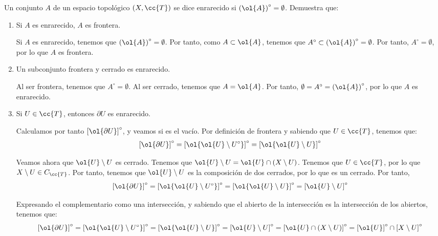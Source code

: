 \begin{ejercicio}
    Un conjunto $A$ de un espacio topológico $(X,\cc{T})$ se dice enrarecido si $\left(\ol{A}\right)^\circ=\emptyset$. Demuestra que:
    \begin{enumerate}
        \item Si $A$ es enrarecido, $A$ es frontera.

        Si $A$ es enrarecido, tenemos que $\left(\ol{A}\right)^\circ=\emptyset$. Por tanto, como $A\subset \ol{A}$, tenemos que $A^\circ \subset \left(\ol{A}\right)^\circ = \emptyset$. Por tanto, $A^\circ =\emptyset$, por lo que $A$ es frontera.

        
        \item Un subconjunto frontera y cerrado es enrarecido.

        Al ser frontera, tenemos que $A^\circ = \emptyset$. Al ser cerrado, tenemos que $A=\ol{A}$. Por tanto, $\emptyset = A^\circ = \left(\ol{A}\right)^\circ$, por lo que $A$ es enrarecido.
        
        \item Si $U\in \cc{T}$, entonces $\partial U$ es enrarecido.

        Calculamos por tanto $\left[\ol{\partial U}\right]^\circ$, y veamos si es el vacío. Por definición de frontera y sabiendo que $U\in \cc{T}$, tenemos que:
        $$\left[\ol{\partial U}\right]^\circ
            = \left[\ol{\ol{U}\setminus U^\circ}\right]^\circ
            = \left[\ol{\ol{U}\setminus U}\right]^\circ$$

        Veamos ahora que ${\ol{U}\setminus U}$ es cerrado. Tenemos que ${\ol{U}\setminus U}=\ol{U}\cap (X\setminus U)$. Tenemos que $U\in \cc{T}$, por lo que $X\setminus U\in C_\cc{T}$. Por tanto, tenemos que ${\ol{U}\setminus U}$ es la composición de dos cerrados, por lo que es un cerrado. Por tanto, 
        $$\left[\ol{\partial U}\right]^\circ
            = \left[\ol{\ol{U}\setminus U^\circ}\right]^\circ
            = \left[\ol{\ol{U}\setminus U}\right]^\circ
            = \left[\ol{U}\setminus U\right]^\circ$$

        Expresando el complementario como una intersección, y sabiendo que el abierto de la intersección es la intersección de los abiertos, tenemos que:
        $$\left[\ol{\partial U}\right]^\circ
            = \left[\ol{\ol{U}\setminus U^\circ}\right]^\circ
            = \left[\ol{\ol{U}\setminus U}\right]^\circ
            = \left[\ol{U}\setminus U\right]^\circ
            = \left[\ol{U}\cap (X\setminus U)\right]^\circ
            = \left[\ol{U}\right]^\circ\cap \left[X\setminus U\right]^\circ
        $$


\end{enumerate}
\end{ejercicio}
